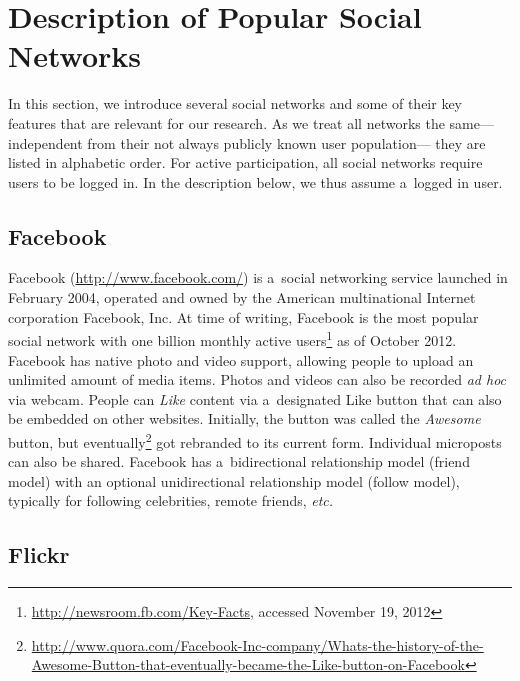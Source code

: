 \section{Description of Popular Social Networks}
\label{sec:description-of-popular-social-networks}

In this section, we introduce several social networks
and some of their key features
that are relevant for our research.
As we treat all networks the same---%
independent from their not always publicly known user population---%
they are listed in alphabetic order.
For active participation,
all social networks require users to be logged in.
In the description below, we thus assume a~logged in user.

\subsection{Facebook}

Facebook (\url{http://www.facebook.com/})
is a~social networking service launched in February 2004,
operated and owned by the American multinational
Internet corporation Facebook, Inc.
At time of writing, Facebook is the most popular social network
with one billion monthly active
users\footnote{\url{http://newsroom.fb.com/Key-Facts},
accessed November 19, 2012}
as of October 2012.
Facebook has native photo and video support,
allowing people to upload an unlimited amount of media items.
Photos and videos can also be recorded \emph{ad hoc} via webcam.
People can \emph{Like} content via a~designated Like button
that can also be embedded on other websites.
Initially, the button was called the \emph{Awesome} button,
but eventually\footnote{\url{http://www.quora.com/Facebook-Inc-company/Whats-the-history-of-the-Awesome-Button-that-eventually-became-the-Like-button-on-Facebook}}
got rebranded to its current form.
Individual microposts can also be shared.
Facebook has a~bidirectional relationship model (friend model)
with an optional unidirectional relationship model (follow model),
typically for following celebrities, remote friends, \emph{etc.}

\subsection{Flickr}

